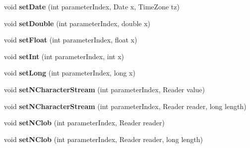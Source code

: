 \begin{DoxyCompactItemize}
void {\bfseries set\+Date} (int parameter\+Index, Date x, Time\+Zone tz)
\item 
\mbox{\label{interfacecom_1_1mysql_1_1cj_1_1_query_bindings_abb2dc0f5ac5f8285d522f5bd1c24083b}} 
void {\bfseries set\+Double} (int parameter\+Index, double x)
\item 
\mbox{\label{interfacecom_1_1mysql_1_1cj_1_1_query_bindings_a47df49247d757f910257c813cb264d80}} 
void {\bfseries set\+Float} (int parameter\+Index, float x)
\item 
\mbox{\label{interfacecom_1_1mysql_1_1cj_1_1_query_bindings_a36d4c03a617f88a81c421892c8f0f5f8}} 
void {\bfseries set\+Int} (int parameter\+Index, int x)
\item 
\mbox{\label{interfacecom_1_1mysql_1_1cj_1_1_query_bindings_a727fb486e20d83e7d38c3ffbe682e3ef}} 
void {\bfseries set\+Long} (int parameter\+Index, long x)
\item 
\mbox{\label{interfacecom_1_1mysql_1_1cj_1_1_query_bindings_ab2221a936de127f08e278adda1fb662b}} 
void {\bfseries set\+N\+Character\+Stream} (int parameter\+Index, Reader value)
\item 
\mbox{\label{interfacecom_1_1mysql_1_1cj_1_1_query_bindings_a70f6f1d622ce392521652e5a16f56d84}} 
void {\bfseries set\+N\+Character\+Stream} (int parameter\+Index, Reader reader, long length)
\item 
\mbox{\label{interfacecom_1_1mysql_1_1cj_1_1_query_bindings_a42336834f57b9020ee679888278cfd2d}} 
void {\bfseries set\+N\+Clob} (int parameter\+Index, Reader reader)
\item 
\mbox{\label{interfacecom_1_1mysql_1_1cj_1_1_query_bindings_a4f84dc603e3f63e4b8b3adc3672ea9bf}} 
void {\bfseries set\+N\+Clob} (int parameter\+Index, Reader reader, long length)
\item 
\mbox{\label{interfacecom_1_1mysql_1_1cj_1_1_query_bindings_a64f163d0ed5afff20b74d2cef23754b2}} 

\end{DoxyCompactItemize}
